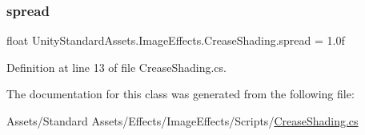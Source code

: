 \subsubsection{\texorpdfstring{spread}{spread}}
{\footnotesize\ttfamily float Unity\+Standard\+Assets.\+Image\+Effects.\+Crease\+Shading.\+spread = 1.\+0f}



Definition at line 13 of file Crease\+Shading.\+cs.



The documentation for this class was generated from the following file\+:\begin{DoxyCompactItemize}
\item 
Assets/\+Standard Assets/\+Effects/\+Image\+Effects/\+Scripts/\mbox{\hyperlink{_crease_shading_8cs}{Crease\+Shading.\+cs}}\end{DoxyCompactItemize}
